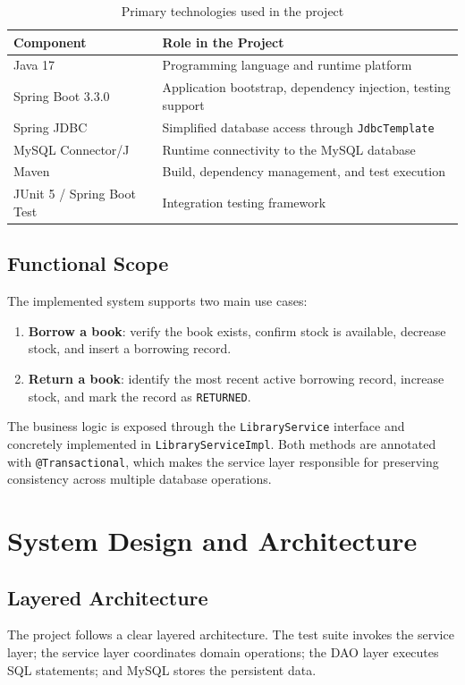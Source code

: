 \documentclass[12pt,a4paper]{report}
\begin{document}
\begin{table}[H]
    \centering
    \caption{Primary technologies used in the project}
    \begin{tabular}{p{4cm} p{8.5cm}}
        \toprule
        \textbf{Component} & \textbf{Role in the Project} \\
        \midrule
        Java 17 & Programming language and runtime platform \\
        Spring Boot 3.3.0 & Application bootstrap, dependency injection, testing support \\
        Spring JDBC & Simplified database access through \texttt{JdbcTemplate} \\
        MySQL Connector/J & Runtime connectivity to the MySQL database \\
        Maven & Build, dependency management, and test execution \\
        JUnit 5 / Spring Boot Test & Integration testing framework \\
        \bottomrule
    \end{tabular}
\end{table}

\section{Functional Scope}
The implemented system supports two main use cases:
\begin{enumerate}
    \item \textbf{Borrow a book}: verify the book exists, confirm stock is available, decrease stock, and insert a borrowing record.
    \item \textbf{Return a book}: identify the most recent active borrowing record, increase stock, and mark the record as \texttt{RETURNED}.
\end{enumerate}

The business logic is exposed through the \texttt{LibraryService} interface and concretely implemented in \texttt{LibraryServiceImpl}. Both methods are annotated with \texttt{@Transactional}, which makes the service layer responsible for preserving consistency across multiple database operations.

\chapter{System Design and Architecture}

\section{Layered Architecture}
The project follows a clear layered architecture. The test suite invokes the service layer; the service layer coordinates domain operations; the DAO layer executes SQL statements; and MySQL stores the persistent data.
\end{document}

